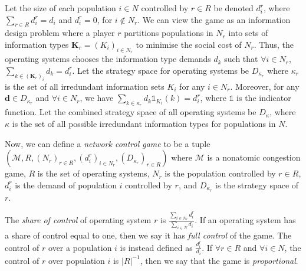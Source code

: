 \documentclass{article}
\begin{document}
    Let the size of each population $i \in N$ controlled by $r \in R$ be denoted $d_i^r$, where $\sum_{r \in R} d_i^r = d_i$ and $d_i^r=0$, for $i \notin N_r$.    We can view the game as an information design problem where a player $r$ partitions populations in $N_r$ into sets of information types $\bm{K}_r=(K_{i})_{i \in N_r}$ to minimise the social cost of $N_r$. Thus, the operating systems chooses the information type demands $d_k$ such that $\forall i \in N_r$, $\sum_{k \in (\bm{K}_r)_i} d_k = d_i^r$. Let the strategy space for operating systems be $D_{\kappa_r}$ where  $\kappa_r$ is the set of all irredundant information sets $K_i$ for any $i \in N_r$. Moreover, for any $\bm{d} \in D_{\kappa_r}$ and $\forall i \in N_r$, we have $\sum_{k \in \kappa_r}d_k \mathds{1}_{K_i}(k) = d_i^r$, where $\mathds{1}$ is the indicator function.  Let the combined strategy space of all operating systems be $D_\kappa$, where $\kappa$ is the set of all possible irredundant information types for populations in $N$. 
    
    Now, we can define a \textit{network control game} to be a tuple $(\mathcal{M}, R, (N_r)_{r \in R}, (d_i^r)_{i \in N_r}, (D_{\kappa_r})_{r \in R})$ where $\mathcal{M}$ is a nonatomic congestion game, $R$ is the set of operating systems, $N_r$ is the population controlled by $r \in R$, $d_i^r$ is the demand of population $i$ controlled by $r$, and $D_{\kappa_r}$ is the strategy space of $r$.
    
   The \textit{share of control} of operating system $r$ is $\frac{\sum_{i \in N_r}d^r_i}{\sum_{i \in N}  d_i}$. If an operating system has a share of control equal to one, then we say it has \textit{full control} of the game. The control of $r$ over a population $i$ is instead defined as $\frac{d^r_i}{d_i}$. If $\forall r \in R$ and $\forall i \in N$, the control of $r$ over population $i$ is $|R|^{-1}$, then we say that the game is \textit{proportional}.
    
\end{document}

